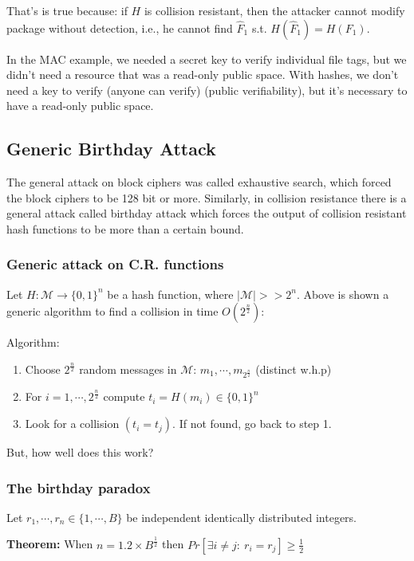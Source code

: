 \documentclass[12pt]{book}
\newcommand{\Thm}{\textbf{Theorem:} }
\begin{document}
That's is true because: if $H$ is collision resistant, then the attacker cannot modify package without detection, i.e., he cannot find $\hat{F}_{1}$ s.t. $H(\hat{F}_{1})=H(F_{1})$.

In the MAC example, we needed a secret key to verify individual file tags, but we didn't need a resource that was a read-only public space. With hashes, we don't need a key to verify (anyone can verify) (public verifiability), but it's necessary to have a read-only public space.

\subsection{Generic Birthday Attack}
The general attack on block ciphers was called exhaustive search, which forced the block ciphers to be 128 bit or more. Similarly, in collision resistance there is a general attack called birthday attack which forces the output of collision resistant hash functions to be more than a certain bound.

\subsubsection{Generic attack on C.R. functions}
Let $H:\mathcal{M}\rightarrow\{0,1\}^{n}$ be a hash function, where $|\mathcal{M}|>>2^{n}$. Above is shown a generic algorithm to find a collision in time $O(2^{\frac{n}{2}})$:

Algorithm:
\begin{enumerate}
	\item Choose $2^{\frac{n}{2}}$ random messages in $\mathcal{M}$: $m_{1},\cdots,m_{2^{\frac{n}{2}}}$ (distinct w.h.p)
	\item For $i=1,\cdots,2^{\frac{n}{2}}$ compute $t_{i}=H(m_{i})\in\{0,1\}^{n}$
	\item Look for a collision $(t_{i}=t_{j})$. If not found, go back to step 1.
\end{enumerate}But, how well does this work?

\subsubsection{The birthday paradox}
Let $r_{1},\cdots,r_{n}\in \{1,\cdots,B\}$ be independent identically distributed integers.

\Thm When $n=1.2 \times B^{\frac{1}{2}}$ then $Pr[\exists i\neq j:\ r_{i}=r_{j}]\geq \frac{1}{2}$
\end{document}
